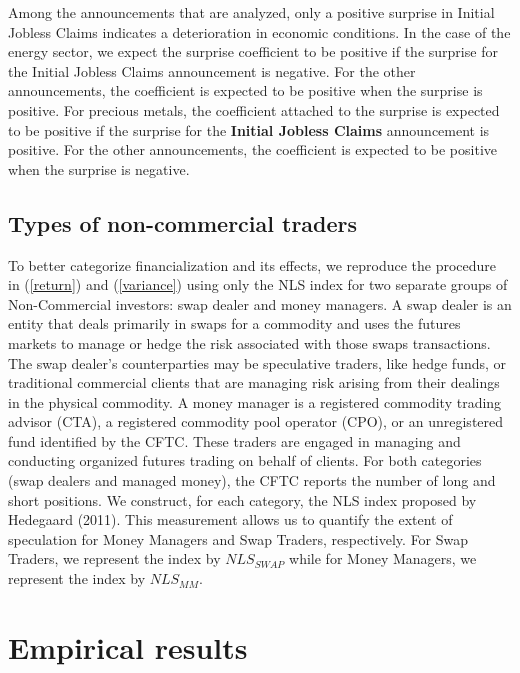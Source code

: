 \documentclass[12pt]{article}
\begin{document}
Among the announcements that are analyzed, only a positive surprise in Initial Jobless Claims indicates a deterioration in economic conditions. In the case of the energy sector, we expect the surprise coefficient to be positive if the surprise for the Initial Jobless Claims announcement is negative. For the other announcements, the coefficient is expected to be positive when the surprise is positive. For precious metals, the coefficient attached to the surprise is expected to be positive if the surprise for the \textbf{Initial Jobless Claims} announcement is positive. For the other announcements, the coefficient is expected to be positive when the surprise is negative.

\subsection{Types of non-commercial traders}
To better categorize financialization and its effects, we reproduce the procedure in (\ref{return})  and (\ref{variance}) using only the NLS index for two separate groups of Non-Commercial investors: swap dealer and money managers. A swap dealer is an entity that deals primarily in swaps for a commodity and uses the futures markets to manage or hedge the risk associated with those swaps transactions. The swap dealer’s counterparties may be speculative traders, like hedge funds, or traditional commercial clients that are managing risk arising from their dealings in the physical commodity. A money manager is a registered commodity trading advisor (CTA), a registered commodity pool operator (CPO), or an unregistered fund identified by the CFTC. These traders are engaged in managing and conducting organized futures trading on behalf of clients. For both categories (swap dealers and managed money), the CFTC reports the number of long and short positions. We construct, for each category, the NLS index proposed by Hedegaard (2011). This measurement allows us to quantify the extent of speculation for Money Managers and Swap Traders, respectively. For Swap Traders, we represent the index by $NLS_{SWAP}$ while for Money Managers, we represent the index by $NLS_{MM}$.



\section{Empirical results} \label{sec:result}
\end{document}
